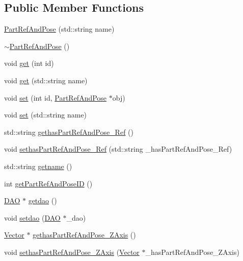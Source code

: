 \subsection*{Public Member Functions}
\begin{DoxyCompactItemize}
\item 
\hyperlink{class_part_ref_and_pose_a1a05e2508dc48971ad91bac1ea5190eb}{PartRefAndPose} (std::string name)
\item 
\hyperlink{class_part_ref_and_pose_a7f01b7c41a9b07ea7c95617178bbacb0}{$\sim$PartRefAndPose} ()
\item 
void \hyperlink{class_part_ref_and_pose_a1bc285545c59e1debf4a21316782f9fa}{get} (int id)
\item 
void \hyperlink{class_part_ref_and_pose_a420e6c89bc4fcbea3ac24c83c377a67f}{get} (std::string name)
\item 
void \hyperlink{class_part_ref_and_pose_afabadb7ad505f5acef2ba29dcd3e6cfe}{set} (int id, \hyperlink{class_part_ref_and_pose}{PartRefAndPose} $\ast$obj)
\item 
void \hyperlink{class_part_ref_and_pose_a722227d5b2ff0c61e4bc8a74e7bd8597}{set} (std::string name)
\item 
std::string \hyperlink{class_part_ref_and_pose_a550d2d1ba6cbf3a7b9ca5b3433d08873}{gethasPartRefAndPose\_\-Ref} ()
\item 
void \hyperlink{class_part_ref_and_pose_a4d5fbc528851fb93949d9b2af5d5e62f}{sethasPartRefAndPose\_\-Ref} (std::string \_\-hasPartRefAndPose\_\-Ref)
\item 
std::string \hyperlink{class_part_ref_and_pose_a4c0143e30e5398e014869db932d117ac}{getname} ()
\item 
int \hyperlink{class_part_ref_and_pose_af67d0cb3457564e0bc6d730339e2aa56}{getPartRefAndPoseID} ()
\item 
\hyperlink{class_d_a_o}{DAO} $\ast$ \hyperlink{class_part_ref_and_pose_a1735464fcf7babfc87ec8d5968c48ca4}{getdao} ()
\item 
void \hyperlink{class_part_ref_and_pose_a4089d24393c5b710e86d7841dde07bdd}{setdao} (\hyperlink{class_d_a_o}{DAO} $\ast$\_\-dao)
\item 
\hyperlink{class_vector}{Vector} $\ast$ \hyperlink{class_part_ref_and_pose_a64672c6e4476b648f2b8fec4e0c03d87}{gethasPartRefAndPose\_\-ZAxis} ()
\item 
void \hyperlink{class_part_ref_and_pose_ae27c07a6851e4f276d2c97c5e75ef0f0}{sethasPartRefAndPose\_\-ZAxis} (\hyperlink{class_vector}{Vector} $\ast$\_\-hasPartRefAndPose\_\-ZAxis)
\item 

\end{DoxyCompactItemize}
